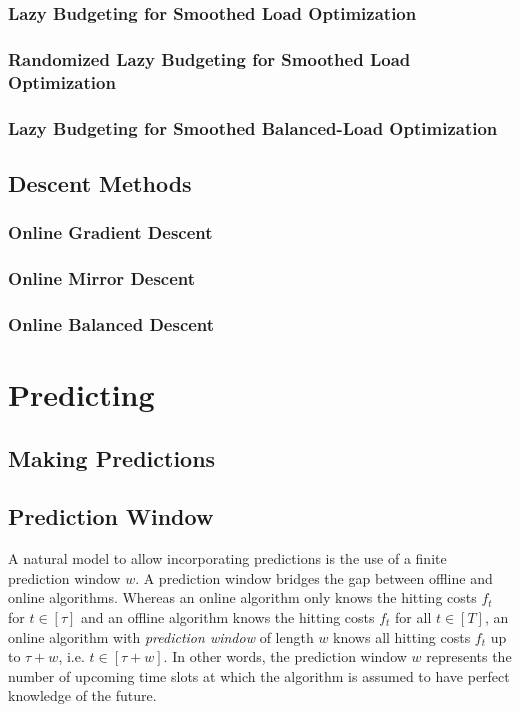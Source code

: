 \subsubsection{Lazy Budgeting for Smoothed Load Optimization}

\subsubsection{Randomized Lazy Budgeting for Smoothed Load Optimization}

\subsubsection{Lazy Budgeting for Smoothed Balanced-Load Optimization}

\subsection{Descent Methods}\label{section:online_algorithms:md:descent_methods}

\subsubsection{Online Gradient Descent}

\subsubsection{Online Mirror Descent}

\subsubsection{Online Balanced Descent}

\section{Predicting}\label{section:online_algorithms:md:predictions}

\subsection{Making Predictions}

\subsection{Prediction Window}

A natural model to allow incorporating predictions is the use of a finite prediction window $w$. A prediction window bridges the gap between offline and online algorithms. Whereas an online algorithm only knows the hitting costs $f_t$ for $t \in [\tau]$ and an offline algorithm knows the hitting costs $f_t$ for all $t \in [T]$, an online algorithm with \emph{prediction window} of length $w$ knows all hitting costs $f_t$ up to $\tau + w$, i.e. $t \in [\tau + w]$. In other words, the prediction window $w$ represents the number of upcoming time slots at which the algorithm is assumed to have perfect knowledge of the future.

